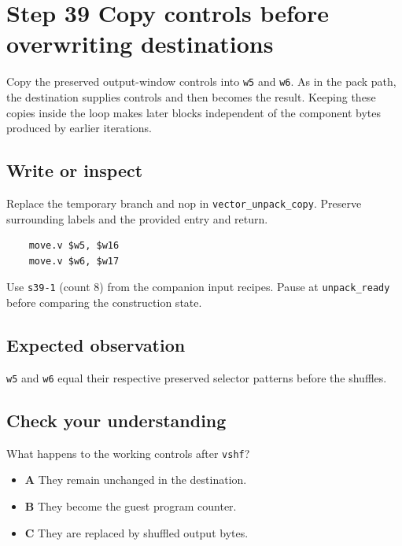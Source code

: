 \section{Step 39 Copy controls before overwriting destinations}\label{rgb-s39}

Copy the preserved output-window controls into \texttt{w5} and \texttt{w6}. As in the pack path, the destination supplies controls and then becomes the result. Keeping these copies inside the loop makes later blocks independent of the component bytes produced by earlier iterations.

\subsection{Write or inspect}
Replace the temporary branch and nop in \texttt{vector\_unpack\_copy}. Preserve surrounding labels and the provided entry and return.

\begin{verbatim}
    move.v $w5, $w16
    move.v $w6, $w17
\end{verbatim}
Use \texttt{s39-1} (count 8) from the companion input recipes. Pause at \texttt{unpack\_ready} before comparing the construction state.

\subsection{Expected observation}
\texttt{w5} and \texttt{w6} equal their respective preserved selector patterns before the shuffles.

\subsection{Check your understanding}
What happens to the working controls after \texttt{vshf}?

\begin{itemize}
  \item \textbf{A} They remain unchanged in the destination.
  \item \textbf{B} They become the guest program counter.
  \item \textbf{C} They are replaced by shuffled output bytes.
\end{itemize}
